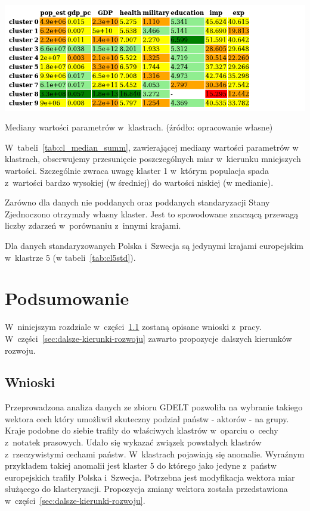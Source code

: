 \documentclass[11pt]{report}
\begin{document}
    \begin{table}[!htp]
        \centering
        \includegraphics[width=\linewidth]{tables/CLUST/desc/cluster_median_summary.png}
        \caption{Mediany wartości parametrów w~klastrach. (źródło: opracowanie własne)}
        \label{tab:cl_median_summ}
    \end{table}
    W~tabeli~\ref{tab:cl_median_summ}, zawierającej mediany wartości parametrów w klastrach, obserwujemy przesunięcie poszczególnych miar w~kierunku mniejszych wartości.
    Szczególnie zwraca uwagę klaster 1 w~którym populacja spada z~wartości bardzo wysokiej (w średniej) do wartości niskiej (w medianie).


    Zarówno dla danych nie poddanych oraz poddanych standaryzacji Stany Zjednoczono otrzymały własny klaster.
    Jest to spowodowane znaczącą przewagą liczby zdarzeń w~porównaniu z~innymi krajami.

    Dla danych standaryzowanych Polska i~Szwecja są jedynymi krajami europejskim w~klastrze 5 (w tabeli~\ref{tab:cl5std}).


    \chapter{Podsumowanie}\label{ch:podsumowanie}
    W~niniejszym rozdziale w~części~\ref{sec:wnioski} zostaną opisane wnioski z~pracy.
    W~części~\ref{sec:dalsze-kierunki-rozwoju} zawarto propozycje dalszych kierunków rozwoju.


    \section{Wnioski}\label{sec:wnioski}
    Przeprowadzona analiza danych ze zbioru GDELT pozwoliła na wybranie takiego wektora cech który umożliwił skuteczny podział państw - aktorów - na grupy.
    Kraje podobne do siebie trafiły do właściwych klastrów w~oparciu o~cechy z~notatek prasowych.
    Udało się wykazać związek powstałych klastrów z~rzeczywistymi cechami państw.
    W~klastrach pojawiają się anomalie.
    Wyraźnym przykładem takiej anomalii jest klaster 5 do którego jako jedyne z~państw europejskich trafiły Polska i~Szwecja.
    Potrzebna jest modyfikacja wektora miar służącego do klasteryzacji.
    Propozycja zmiany wektora została przedstawiona w~części~\ref{sec:dalsze-kierunki-rozwoju}.
\end{document}
